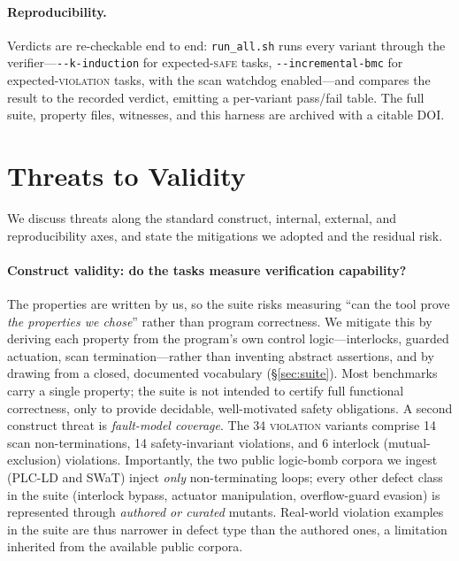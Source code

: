 \paragraph{Reproducibility.}
Verdicts are re-checkable end to end: \texttt{run\_all.sh} runs every variant through
the verifier---\texttt{-{}-k-induction} for expected-\textsc{safe} tasks,
\texttt{-{}-incremental-bmc} for expected-\textsc{violation} tasks, with the scan
watchdog enabled---and compares the result to the recorded verdict, emitting a
per-variant pass/fail table. The full suite, property files, witnesses, and this
harness are archived with a citable DOI.


\section{Threats to Validity}
\label{sec:threats}

We discuss threats along the standard construct, internal, external, and
reproducibility axes, and state the mitigations we adopted and the residual risk.

\paragraph{Construct validity: do the tasks measure verification capability?}
The properties are written by us, so the suite risks measuring ``can the tool prove
\emph{the properties we chose}'' rather than program correctness. We mitigate this by
deriving each property from the program's own control logic---interlocks, guarded
actuation, scan termination---rather than inventing abstract assertions, and by drawing
from a closed, documented vocabulary (\S\ref{sec:suite}). Most benchmarks carry a single
property; the suite is not intended to certify full functional correctness, only to
provide decidable, well-motivated safety obligations. A second construct threat is
\emph{fault-model coverage}. The 34 \textsc{violation} variants comprise 14 scan
non-terminations, 14 safety-invariant violations, and 6 interlock (mutual-exclusion)
violations. Importantly, the two public logic-bomb corpora we ingest (PLC-LD and SWaT)
inject \emph{only} non-terminating loops; every other defect class in the suite
(interlock bypass, actuator manipulation, overflow-guard evasion) is represented through
\emph{authored or curated} mutants. Real-world violation examples in the suite are thus
narrower in defect type than the authored ones, a limitation inherited from the available
public corpora.

